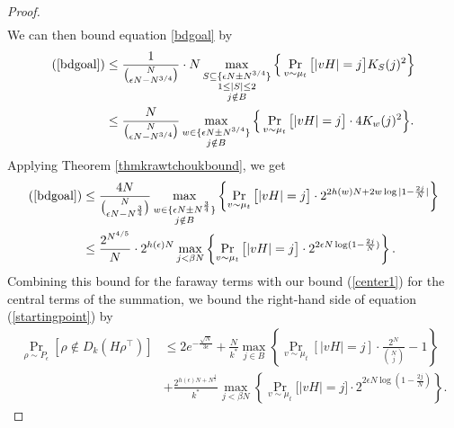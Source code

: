 \documentclass[12pt]{article}
\begin{document}
\begin{proof}
\begin{align*}
\end{align*}
We can then bound equation \ref{bdgoal} by
\begin{align*}
    (\ref{bdgoal})&\leq\frac{1}{\binom{N}{\epsilon N-N^{3/4}}}\cdot N \mathop{\max}_{\substack{S\subseteq \{\epsilon N\pm N^{3/4}\} \\
    1\leq|S|\leq 2\\
    j\notin B}}\Big\{ \Pr_{v\sim\mu_{t}}\big[|v H|=j\big] K_S(j)^2  \Big\}\nonumber\\
    &\leq\frac{N}{\binom{N}{\epsilon N-N^{3/4}}} \mathop{\max}_{\substack{w\in\{\epsilon N\pm N^{3/4}\}\\
    j\notin B}}\Big\{ \Pr_{v\sim\mu_{t}}\big[|v H|=j\big]\cdot 4 K_{w}(j)^2  \Big\}.
\end{align*}
Applying Theorem \ref{thmkrawtchoukbound}, we get
\begin{align*}
(\ref{bdgoal})&\leq \frac{ 4N }{\binom{N}{\epsilon N-N^{\frac{3}{4}}}}\max_{\substack{w\in \{\epsilon N\pm N^{\frac{3}{4}}\} \\j\notin B}}\left\{ \Pr_{v\sim \mu_t}\big[|v H|=j\big]\cdot 2^{2h(w)N+2w\log|1-\frac{2j}{N}|} \right\}\nonumber\\
&\leq \frac{2^{N^{4/5}}}{N}\cdot2^{h(\epsilon)N}  \max_{ j<\beta N}\left\{ \Pr_{v\sim \mu_t}\big[|v H|=j\big]\cdot  2^{2\epsilon N\log(1-\frac{2j}{N})} \right\}.
\end{align*}
Combining this bound for the faraway terms with our bound (\ref{center1}) for the central terms of the summation, we bound the right-hand side of equation (\ref{startingpoint}) by
\begin{align*}
\Pr_{\rho\sim P_\epsilon}[\rho\notin D_k(H\rho^\intercal)]&\leq 2e^{-\frac{\sqrt{N}}{3\epsilon}}+\frac{N}{k^*} \max_{j\in B}\left\{ \Pr_{v\sim \mu_t}[|v H|=j] \cdot \frac{2^N}{\binom{N}{j}}-1\right\} \nonumber\\
&+\frac{2^{h(\epsilon)N+N^{\frac{4}{5}}}}{k^*}  \max_{ j<\beta N}\left\{ \Pr_{v\sim \mu_t}\big[|v H|=j\big]\cdot  2^{2\epsilon N\log(1-\frac{2j}{N})} \right\}. 
\end{align*}
\end{proof}
\end{document}

